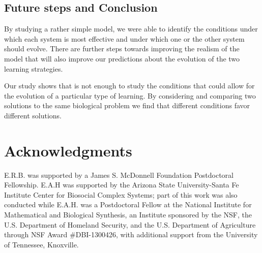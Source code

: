  
\subsection*{Future steps and Conclusion}
 
By studying a rather simple model, we were able to identify the conditions under which each system is most effective and under which one or the other system should evolve. There are further steps towards improving the realism of the model that will also improve our predictions about the evolution of the two learning strategies. 

Our study shows that is not enough to study the conditions that could allow for the evolution of a particular type of learning. By considering and comparing two solutions to the same biological problem we find that different conditions favor different solutions. %



\section*{Acknowledgments}
E.R.B. was supported by a James S. McDonnell Foundation Postdoctoral Fellowship. E.A.H was supported by the Arizona State University-Santa Fe Institute Center for Biosocial Complex Systems; part of this work was also conducted while E.A.H. was a Postdoctoral Fellow at the National Institute for Mathematical and Biological Synthesis, an Institute sponsored by the NSF, the U.S. Department of Homeland Security, and the U.S. Department of Agriculture through NSF Award \#DBI-1300426, with additional support from the University of Tennessee, Knoxville.  

